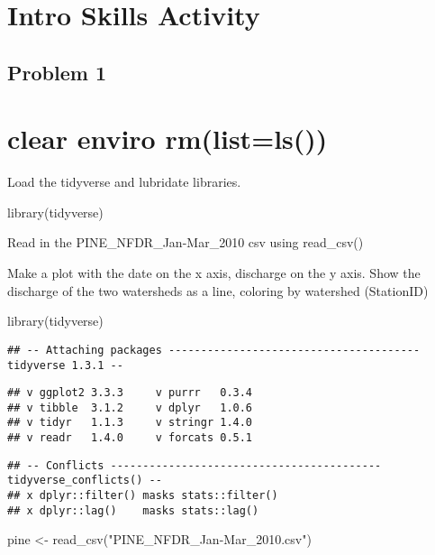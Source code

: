 \documentclass[
]{article}
\author{}
\date{\vspace{-2.5em}}
\newenvironment{Shaded}{\begin{snugshade}}{\end{snugshade}}
\newcommand{\FunctionTok}[1]{\textcolor[rgb]{0.00,0.00,0.00}{#1}}
\newcommand{\NormalTok}[1]{#1}
\newcommand{\OtherTok}[1]{\textcolor[rgb]{0.56,0.35,0.01}{#1}}
\newcommand{\StringTok}[1]{\textcolor[rgb]{0.31,0.60,0.02}{#1}}
\begin{document}
\hypertarget{introactivity}{%
\section{Intro Skills Activity}\label{introactivity}}

\hypertarget{problem-1}{%
\subsection{Problem 1}\label{problem-1}}

\hypertarget{clear-enviro-rmlistls}{%
\section{clear enviro rm(list=ls())}\label{clear-enviro-rmlistls}}

Load the tidyverse and lubridate libraries.

library(tidyverse)

Read in the PINE\_NFDR\_Jan-Mar\_2010 csv using read\_csv()

Make a plot with the date on the x axis, discharge on the y axis. Show
the discharge of the two watersheds as a line, coloring by watershed
(StationID)

\begin{Shaded}
\begin{Highlighting}[]
\FunctionTok{library}\NormalTok{(tidyverse)}
\end{Highlighting}
\end{Shaded}

\begin{verbatim}
## -- Attaching packages --------------------------------------- tidyverse 1.3.1 --
\end{verbatim}

\begin{verbatim}
## v ggplot2 3.3.3     v purrr   0.3.4
## v tibble  3.1.2     v dplyr   1.0.6
## v tidyr   1.1.3     v stringr 1.4.0
## v readr   1.4.0     v forcats 0.5.1
\end{verbatim}

\begin{verbatim}
## -- Conflicts ------------------------------------------ tidyverse_conflicts() --
## x dplyr::filter() masks stats::filter()
## x dplyr::lag()    masks stats::lag()
\end{verbatim}

\begin{Shaded}
\begin{Highlighting}[]
\NormalTok{pine }\OtherTok{\textless{}{-}} \FunctionTok{read\_csv}\NormalTok{(}\StringTok{"PINE\_NFDR\_Jan{-}Mar\_2010.csv"}\NormalTok{)}
\end{Highlighting}
\end{Shaded}
\end{document}
